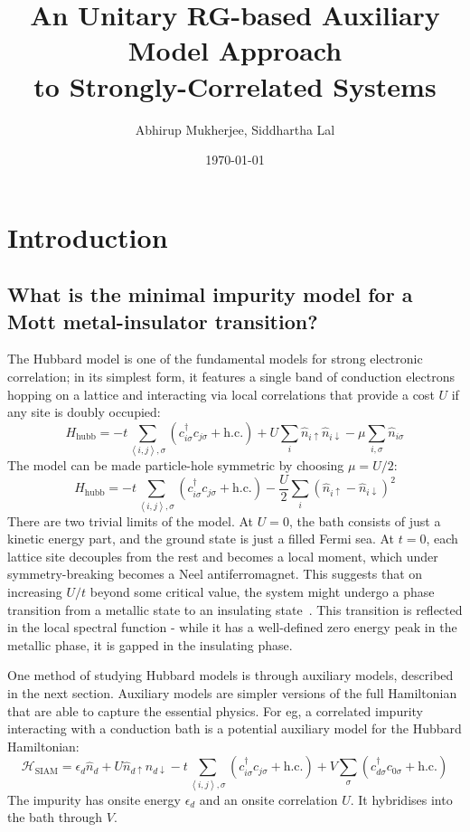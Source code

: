 \documentclass{report}
\title{\bf An Unitary RG-based Auxiliary Model Approach\\ to Strongly-Correlated Systems}
\author{Abhirup Mukherjee, Siddhartha Lal}
\affil{Indian Institute of Science Education and Research Kolkata, Mohanpur}
\date{\today}
\numberwithin{equation}{section}
\begin{document}
\maketitle
\tableofcontents
\newpage
\chapter{Introduction}

\section{What is the minimal impurity model for a Mott metal-insulator transition?}
\label{sec:min_model}
The Hubbard model is one of the fundamental models for strong electronic correlation; in its simplest form, it features a single band of conduction electrons hopping on a lattice and interacting via local correlations that provide a cost \(U\) if any site is doubly occupied:
\[H_\text{hubb} = -t\sum_{\left<i,j \right>,\sigma}\left(c^\dagger_{i\sigma}c_{j\sigma}+\text{h.c.}\right) + U\sum_i \hat n_{i \uparrow} \hat n_{i \downarrow} - \mu \sum_{i,\sigma}\hat n_{i\sigma}\]
The model can be made particle-hole symmetric by choosing \(\mu = U/2\):
\[H_\text{hubb} = -t\sum_{\left<i,j \right>,\sigma}\left(c^\dagger_{i\sigma}c_{j\sigma}+\text{h.c.}\right) - \frac{U}{2}\sum_i \left(\hat n_{i \uparrow} - \hat n_{i \downarrow}\right)^2\]
There are two trivial limits of the model. At \(U=0\), the bath consists of just a kinetic energy part, and the ground state is just a filled Fermi sea. At \(t=0\), each lattice site decouples from the rest and becomes a local moment, which under symmetry-breaking becomes a Neel antiferromagnet. This suggests that on increasing \(U/t\) beyond some critical value, the system might undergo a phase transition from a metallic state to an insulating state~\cite{Mott_1949}. This transition is reflected in the local spectral function - while it has a well-defined zero energy peak in the metallic phase, it is gapped in the insulating phase.

One method of studying Hubbard models is through auxiliary models, described in the next section. Auxiliary models are simpler versions of the full Hamiltonian that are able to capture the essential physics. For eg, a correlated impurity interacting with a conduction bath is a potential auxiliary model for the Hubbard Hamiltonian:
\begin{equation}
\label{clus_bath_siam}
\mathcal{H}_\text{SIAM} = \epsilon_d \hat n_d + U \hat n_{d \uparrow} \hat n_{d \downarrow} - t\sum_{\left<i,j \right>, \sigma}\left(c^\dagger_{i\sigma}c_{j\sigma} + \text{h.c.}\right) + V\sum_\sigma \left( c^\dagger_{d\sigma}c_{0\sigma} + \text{h.c.}\right) 
\end{equation}
The impurity has onsite energy \(\epsilon_d\) and an onsite correlation \(U\). It hybridises into the bath through \(V\).
\end{document}
